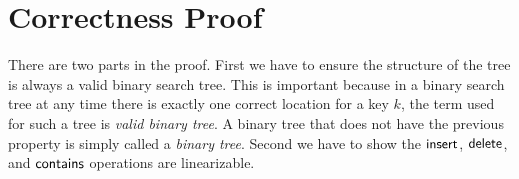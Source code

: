 

\section{Correctness Proof}

% 



There are two parts in the proof.
First we have to ensure the structure of the tree is always a valid binary search tree.
This is important because in a binary search tree at any time there is exactly one correct location for a key $k$, the term used for such a tree is \emph{valid binary tree}.
A binary tree that does not have the previous property is simply called a \emph{binary tree}.
Second we have to show the $\act{insert}$, $\act{delete}$, and $\act{contains}$ operations are linearizable.


